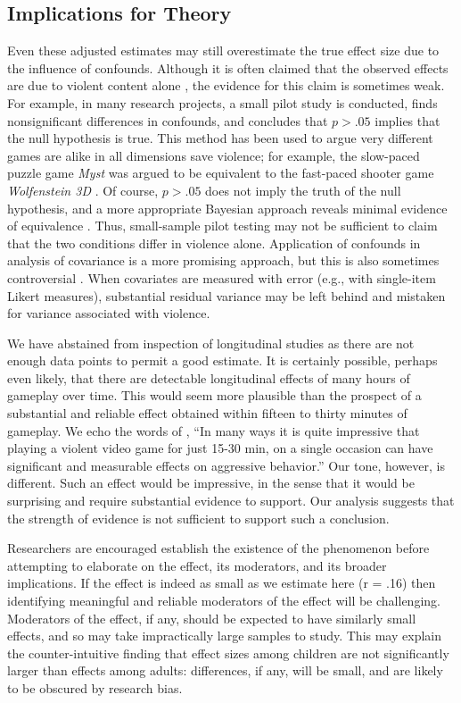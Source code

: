 \documentclass[man]{apa6}
\begin{document}
\subsection{Implications for Theory}
Even these adjusted estimates may still overestimate the true effect size due to the influence of confounds. Although it is often claimed that the observed effects are due to violent content alone \citep[][e.g.,]{Anderson:etal:2004}, the evidence for this claim is sometimes weak. For example, in many research projects, a small pilot study is conducted, finds nonsignificant differences in confounds, and concludes that $p > .05$ implies that the null hypothesis is true. This method has been used to argue very different games are alike in all dimensions save violence; for example, the slow-paced puzzle game {\em Myst} was argued to be equivalent to the fast-paced shooter game {\em Wolfenstein 3D} \citep{Anderson:Dill:2000}. Of course, $p > .05$ does not imply the truth of the null hypothesis, and a more appropriate Bayesian approach reveals minimal evidence of equivalence \citep{Hilgard:etal:2015}. Thus, small-sample pilot testing may not be sufficient to claim that the two conditions differ in violence alone. Application of confounds in analysis of covariance is a more promising approach, but this is also sometimes controversial \citep{Miller:Chapman:2001}. When covariates are measured with error (e.g., with single-item Likert measures), substantial residual variance may be left behind and mistaken for variance associated with violence.

We have abstained from inspection of longitudinal studies as there are not enough data points to permit a good estimate. It is certainly possible, perhaps even likely, that there are detectable longitudinal effects of many hours of gameplay over time. This would seem more plausible than the prospect of a substantial and reliable effect obtained within fifteen to thirty minutes of gameplay. We echo the words of \citet[p. 51]{Bushman:Huesmann:2014}, ``In many ways it is quite impressive that playing a violent video game for just 15-30 min, on a single occasion can have significant and measurable effects on aggressive behavior.'' Our tone, however, is different. Such an effect would be impressive, in the sense that it would be surprising and require substantial evidence to support. Our analysis suggests that the strength of evidence is not sufficient to support such a conclusion.

Researchers are encouraged establish the existence of the phenomenon before attempting to elaborate on the effect, its moderators, and its broader implications. If the effect is indeed as small as we estimate here (r = .16) then identifying meaningful and reliable moderators of the effect will be challenging.  Moderators of the effect, if any, should be expected to have similarly small effects, and so may take impractically large samples to study. This may explain the counter-intuitive finding that effect sizes among children are not significantly larger than effects among adults: differences, if any, will be small, and are likely to be obscured by research bias. 
\end{document}

